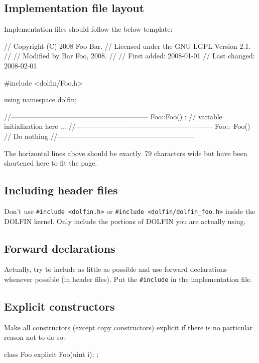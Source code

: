 \subsection{Implementation file layout}

Implementation files should follow the below template:
\begin{code}
// Copyright (C) 2008 Foo Bar.
// Licensed under the GNU LGPL Version 2.1.
//
// Modified by Bar Foo, 2008.
//
// First added:  2008-01-01
// Last changed: 2008-02-01

#include <dolfin/Foo.h>

using namespace dolfin;

//-----------------------------------------------------------
Foo::Foo() : // variable initialization here
{
  ...
}
//-----------------------------------------------------------
Foo::~Foo()
{
  // Do nothing
}
//-----------------------------------------------------------
\end{code}

The horizontal lines above should be exactly~79 characters
wide but have been shortened here to fit the page.

\subsection{Including header files}

Don't use \texttt{\#include <dolfin.h>} or \texttt{\#include
  <dolfin/dolfin\_foo.h>} inside the DOLFIN kernel. Only include the
portions of DOLFIN you are actually using.

\subsection{Forward declarations}

Actually, try to include as little as possible and use forward
declarations whenever possible (in header files). Put the
\texttt{\#include} in the implementation file.

\subsection{Explicit constructors}

Make all constructors (except copy constructors) explicit if there is no particular
reason not to do so:
\begin{code}
class Foo
{
  explicit Foo(uint i);
};
\end{code}
